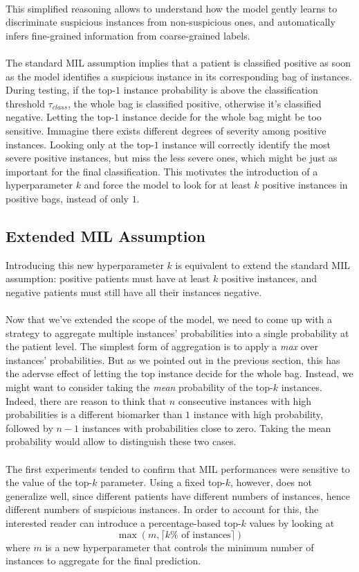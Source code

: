 \documentclass[final]{cvpr}
\begin{document}
	 \\
	 This simplified reasoning allows to understand	how the model gently learns to discriminate suspicious instances from non-suspicious ones, and automatically infers fine-grained information from coarse-grained labels.\\
	 \\
	The standard MIL assumption implies that a patient is classified positive as soon as the model identifies a suspicious instance in its corresponding bag of instances. During testing, if the top-$1$ instance probability is above the classification threshold $\tau_{class}$, the whole bag is classified positive, otherwise it's classified negative. Letting the top-$1$ instance decide for the whole bag might be too sensitive. Immagine there exists different degrees of severity among positive instances. Looking only at the top-$1$ instance will correctly identify the most severe positive instances, but miss the less severe ones, which might be just as important for the final classification. This motivates the introduction of a hyperparameter $k$ and force the model to look for at least $k$ positive instances in positive bags, instead of only $1$.

	\subsection{Extended  MIL Assumption} 
	
	Introducing this new hyperparameter $k$ is equivalent to extend the standard MIL assumption: positive patients must have at least $k$ positive instances, and negative patients must still have all their instances negative.\\
	\\
	Now that we've extended the scope of the model, we need to come up with a strategy to aggregate multiple instances' probabilities into a single probability at the patient level. The simplest form of aggregation is to apply a \textit{max} over instances’ probabilities. But as we pointed out in the previous section, this has the adervse effect of letting the top instance decide for the whole bag. Instead, we might want to consider taking the \textit{mean} probability of the top-$k$ instances. Indeed, there are reason to think that $n$ consecutive instances with high probabilities is a different biomarker than $1$ instance with high probability, followed by $n-1$ instances with probabilities close to zero. Taking the mean probability would allow to distinguish these two cases.\\
	\\
	The first experiments tended to confirm that MIL performances were sensitive to the value of the top-$k$ parameter. Using a fixed top-$k$, however, does not generalize well, since different patients have different numbers of instances, hence different numbers of suspicious instances. In order to account for this, the interested reader can introduce a percentage-based top-$k$ values by looking at $$ \max \left(m, \lceil k\% \text{ of instances}\rceil\right) $$ where $m$ is a new hyperparameter that controls the minimum number of instances to aggregate for the final prediction.
	
\end{document}

